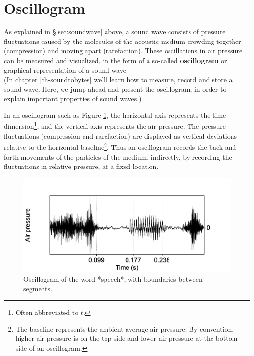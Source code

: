 \documentclass[
]{book}
\begin{document}
\section{Oscillogram}\label{sec:oscillogram}

As explained in §\ref{sec:soundwave} above, a sound wave consists of pressure fluctuations caused by the molecules of the acoustic medium crowding together (compression) and moving apart (rarefaction). These oscillations in air pressure can be measured and visualized, in the form of a so-called \textbf{oscillogram} or graphical representation of a sound wave.\\
(In chapter \ref{ch-soundtobytes} we'll learn how to measure, record and store a sound wave. Here, we jump ahead and present the oscillogram, in order to explain important properties of sound waves.)

In an oscillogram such as Figure \ref{fig:speech-oscillogram}, the horizontal axis represents the time dimension\footnote{Often abbreviated to \(t\).}, and the vertical axis represents the air pressure. The pressure fluctuations (compression and rarefaction) are displayed as vertical deviations relative to the horizontal baseline\footnote{The baseline represents the ambient average air pressure. By convention, higher air pressure is on the top side and lower air pressure at the bottom side of an oscillogram.}.
Thus an oscillogram records the back-and-forth movements of the particles of the medium, indirectly, by recording the fluctuations in relative pressure, at a fixed location.

\begin{figure}

{\centering \includegraphics{figures/speech_word_oscillogram} 

}

\caption{Oscillogram of the word *speech*, with boundaries between segments.}\label{fig:speech-oscillogram}
\end{figure}
\end{document}
